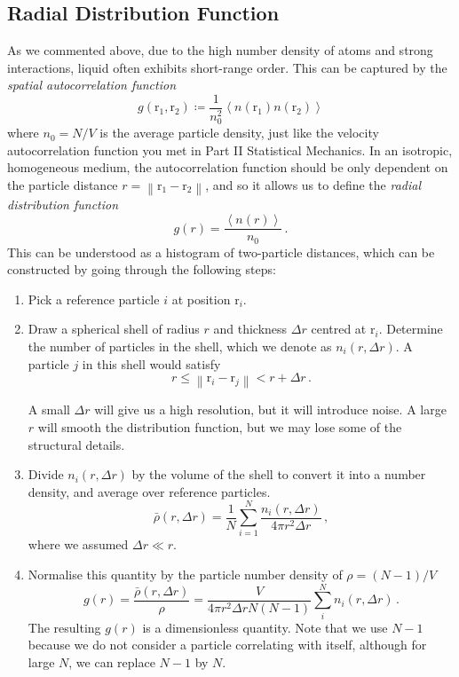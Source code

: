 \documentclass{article}
\theoremstyle{plain}\theoremheaderfont{\normalfont\itshape}\theorembodyfont{\rmfamily}\theoremseparator{.}\newtheorem*{rem}{Remark}\newtheorem*{ex}{Example}\newtheorem*{proof}{Proof}\newtheorem*{altp}{Alternative proof}
\theoremstyle{plain}\theoremheaderfont{\normalfont\bfseries}\theorembodyfont{\rmfamily}\theoremseparator{.}\newtheorem{thm}{Theorem}[section]\newtheorem{lem}[thm]{Lemma}\newtheorem{prop}[thm]{Proposition}\newtheorem*{cor}{Corollary}\newtheorem{defn}[thm]{Definition}\newtheorem{clm}[thm]{Claim}\newtheorem{clminproof}{Claim}\newtheorem{alg}[thm]{Algorithm}\newtheorem{hyp}[thm]{Hypothesis}\newtheorem{law}[thm]{Law}
\theoremstyle{break}\theoremheaderfont{\normalfont\itshape}\theorembodyfont{\rmfamily}\theoremseparator{.\medskip}\newtheorem*{proofskip}{Proof}\newtheorem*{exs}{Examples}\newtheorem*{rems}{Remarks}
\theoremstyle{break}\theoremheaderfont{\normalfont\bfseries}\theorembodyfont{\rmfamily}\theoremseparator{.\medskip}\newtheorem{lemskip}[thm]{Lemma}\newtheorem{defnskip}[thm]{Definition}\newtheorem{propskip}[thm]{Proposition}\newtheorem{thmskip}[thm]{Theorem}
\numberwithin{equation}{section}
\newcommand{\eval}[1]{\left\langle #1 \right\rangle}
\newcommand{\vb}[1]{\bm{\mathrm{#1}}}
\newcommand{\norm}[1]{\left\| #1 \right\|}
\begin{document}
    \subsection{Radial Distribution Function}
    As we commented above, due to the high number density of atoms and strong interactions, liquid often exhibits short-range order. This can be captured by the \textit{spatial autocorrelation function}
    \begin{equation}
        g(\vb{r}_1,\vb{r}_2)\coloneqq\frac{1}{n_0^2}\eval{n(\vb{r}_1)n(\vb{r}_2)}
    \end{equation}
    where \(n_0=N/V\) is the average particle density, just like the velocity autocorrelation function you met in Part II Statistical Mechanics. In an isotropic, homogeneous medium, the autocorrelation function should be only dependent on the particle distance \(r=\norm{\vb{r}_1-\vb{r}_2}\), and so it allows us to define the \textit{radial distribution function}
    \begin{equation}
        g(r)=\frac{\eval{n(r)}}{n_0}\,.
    \end{equation}
    This can be understood as a histogram of two-particle distances, which can be constructed by going through the following steps:
    \begin{enumerate}[topsep=0pt]
        \item Pick a reference particle \(i\) at position \(\vb{r}_i\).
        \item Draw a spherical shell of radius \(r\) and thickness \(\Delta r\) centred at \(\vb{r}_i\). Determine the number of particles in the shell, which we denote as \(n_i(r,\Delta r)\). A particle \(j\) in this shell would satisfy
        \begin{equation}
            r\le \norm{\vb{r}_i-\vb{r}_j}<r+\Delta r\,.
        \end{equation}

        A small \(\Delta r\) will give us a high resolution, but it will introduce noise. A large \(r\) will smooth the distribution function, but we may lose some of the structural details.
        \item Divide \(n_i(r,\Delta r)\) by the volume of the shell to convert it into a number density, and average over reference particles.
        \begin{equation}
            \bar{\rho}(r,\Delta r)=\frac{1}{N}\sum_{i=1}^{N}\frac{n_i(r,\Delta r)}{4\pi r^2\Delta r}\,,
        \end{equation}
        where we assumed \(\Delta r\ll r\).
        \item Normalise this quantity by the particle number density of \(\rho=(N-1)/V\)
        \begin{equation}\label{radial_distribution_function}
            g(r)=\frac{\bar{\rho}(r,\Delta r)}{\rho}=\frac{V}{4\pi r^2\Delta r N(N-1)}\sum_{i}^{N}n_i(r,\Delta r)\,.
        \end{equation}
        The resulting \(g(r)\) is a dimensionless quantity. Note that we use \(N-1\) because we do not consider a particle correlating with itself, although for large \(N\), we can replace \(N-1\) by \(N\).
    \end{enumerate}
\end{document}
